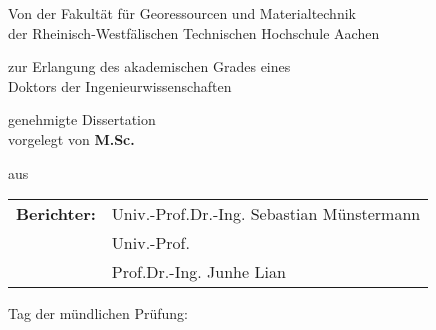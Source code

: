 \begin{titlepage}
    \begin{center}
        \large
        \vspace*{1cm}
        
        \textbf{\titlename}
        
        
        \vspace*{1.0cm}
        Von der Fakultät für Georessourcen und Materialtechnik\\
        der Rheinisch-Westfälischen Technischen Hochschule Aachen
        
        \vspace*{1.5cm}
        zur Erlangung des akademischen Grades eines\\
        Doktors der Ingenieurwissenschaften
        
        \vspace*{1.5cm}
        genehmigte Dissertation \\
        vorgelegt von \textbf{M.Sc.}
        
        \vspace*{2.0cm}
        \textbf{\authorname}
        
        \vspace*{2.0cm}
        aus \fromcityname
    \end{center}
    
    \large
    \vspace*{2.0cm}
    
    \begin{tabular}{l  l}
        \textbf{Berichter:} & Univ.-Prof.Dr.-Ing. Sebastian Münstermann \\
                            & Univ.-Prof. \\
                            & Prof.Dr.-Ing. Junhe Lian
    \end{tabular}
    
    \vspace*{2.0cm}
    Tag der mündlichen Prüfung: 
    
    \normalsize
    \vspace*{1.5cm}


\end{titlepage}
